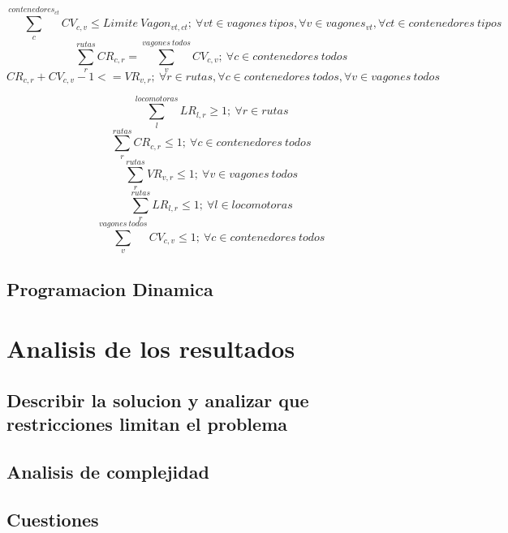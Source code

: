 \documentclass[11pt,spanish]{article}
\begin{document}
			\begin{equation}
				\sum_c^{contenedores_{ct}}CV_{c,v} \leq Limite\ Vagon_{vt,ct};\ \forall vt \in vagones\ tipos, \forall v \in vagones_{vt}, \forall ct \in contenedores\ tipos
			\end{equation}
			\begin{equation}
				\sum_r^{rutas} CR_{c,r} = \sum_v^{vagones\ todos} CV_{c,v};\ \forall c \in contenedores\ todos
			\end{equation}
			\begin{equation}
				CR_{c,r}+CV_{c,v}-1<=VR_{v,r};\ \forall r \in rutas, \forall c \in contenedores\ todos, \forall v \in vagones\ todos
			\end{equation}


			\begin{equation}
			\sum_l^{locomotoras}LR_{l,r} \geq 1;\ \forall r \in rutas
			\end{equation}
			\begin{equation}
			\sum_r^{rutas}CR_{c,r} \leq 1;\ \forall c \in contenedores\ todos
			\end{equation}
			\begin{equation}
			\sum_r^{rutas}VR_{v,r} \leq 1;\ \forall v \in vagones\ todos
			\end{equation}
			\begin{equation}
			\sum_r^{rutas} LR_{l,r} \leq 1;\ \forall l \in locomotoras
			\end{equation}
			\begin{equation}
			\sum_v^{vagones\ todos}CV_{c,v} \leq 1;\ \forall c \in contenedores\ todos
			\end{equation}
			
		\subsection{Programacion Dinamica}
	\section{Analisis de los resultados}
		\subsection{Describir la solucion y analizar que restricciones limitan el problema}
		\subsection{Analisis de complejidad}
		\subsection{Cuestiones}
\end{document}
